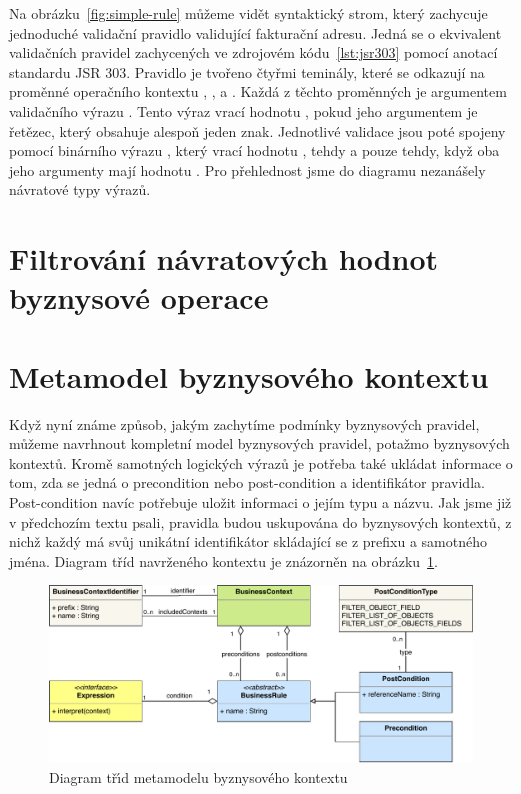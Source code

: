 Na obrázku~\ref{fig:simple-rule} můžeme vidět syntaktický strom, který zachycuje jednoduché
validační pravidlo validující fakturační adresu. Jedná se o ekvivalent validačních pravidel
zachycených ve zdrojovém kódu~\ref{lst:jsr303} pomocí anotací standardu \gls{JSR} 303.
Pravidlo je tvořeno čtyřmi teminály, které se odkazují na proměnné operačního kontextu ,
,  a . Každá z těchto proměnných je argumentem validačního výrazu
. Tento výraz vrací hodnotu , pokud jeho argumentem je řetězec, který obsahuje
alespoň jeden znak. Jednotlivé validace jsou poté spojeny pomocí binárního výrazu ,
který vrací hodnotu , tehdy a pouze tehdy, když oba jeho argumenty mají hodnotu .
Pro přehlednost jsme do diagramu nezanášely návratové typy výrazů.

\section{Filtrování návratových hodnot byznysové operace}


\section{Metamodel byznysového kontextu}\label{sec:metamodel}

Když nyní známe způsob, jakým zachytíme podmínky byznysových pravidel, můžeme
navrhnout kompletní model byznysových pravidel, potažmo byznysových kontextů.
Kromě samotných logických výrazů je potřeba také ukládat informace o tom, zda
se jedná o precondition nebo post-condition a identifikátor pravidla. Post-condition
navíc potřebuje uložit informaci o jejím typu a názvu. Jak jsme již v předchozím
textu psali, pravidla budou uskupována do byznysových kontextů, z nichž každý
má svůj unikátní identifikátor skládající se z prefixu a samotného jména.
Diagram tříd navrženého kontextu je znázorněn na obrázku~\ref{fig:business-context-metamodel}.

\begin{figure}
    \centering
    \includegraphics[keepaspectratio=true, width=\linewidth]{figures/business-context-metamodel.pdf}
    \caption{Diagram tř\'{\i}d metamodelu byznysového kontextu}
    \label{fig:business-context-metamodel}
\end{figure}

